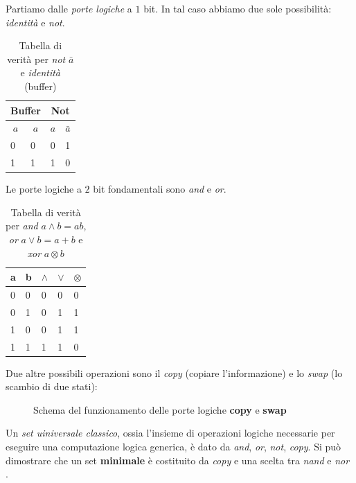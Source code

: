 \documentclass[../../InformazioneQuantistica.tex]{subfiles}
\begin{document}
Partiamo dalle \textit{porte logiche} a $1$ bit. In tal caso abbiamo due sole possibilità: \textit{identità} e \textit{not}.

\begin{table}[H]
\centering
\begin{tabular}{@{}ll|ll@{}}
\toprule
\multicolumn{2}{c|}{\textbf{Buffer}} & \multicolumn{2}{c|}{\textbf{Not}} \\ \midrule
\multicolumn{1}{c}{$a$} & \multicolumn{1}{c|}{$a$} & \multicolumn{1}{c}{$a$} & \multicolumn{1}{c}{$\bar{a}$} \\
0 & 0 & 0 & 1 \\
1 & 1 & 1 & 0 \\ \bottomrule
\end{tabular}
\caption{Tabella di verità per \textit{not} $\bar{a}$ e \textit{identità} (buffer)}
\label{tab:notbuffer}
\end{table}

Le porte logiche a $2$ bit fondamentali sono \textit{and} e \textit{or}.
\begin{table}[H]
\centering
\begin{tabular}{@{}ll|lll@{}}
\toprule
\multicolumn{1}{c}{a} & \multicolumn{1}{c}{b} & \multicolumn{1}{c}{$\land$} & \multicolumn{1}{c}{$\lor$} & \multicolumn{1}{c}{$\otimes$} \\ \midrule
0 & 0 & 0 & 0 & 0 \\
0 & 1 & 0 & 1 & 1 \\
1 & 0 & 0 & 1 & 1 \\
1 & 1 & 1 & 1 & 0 \\ \bottomrule
\end{tabular}
\caption{Tabella di verità per \textit{and} $a \land b = ab$, \textit{or} $a\lor b =a+b$ e \textit{xor} $a\otimes b$}
\label{tab:orandxor}
\end{table}

Due altre possibili operazioni sono il \emph{copy} (copiare l'informazione) e lo \emph{swap} (lo scambio di due stati):

\begin{figure}[H]
\centering

\caption{Schema del funzionamento delle porte logiche \textbf{copy} e \textbf{swap}\label{fig:copy-swap}}
\end{figure}

Un \textit{set uiniversale classico}, ossia l'insieme di operazioni logiche necessarie per eseguire una computazione logica generica, è dato da \textit{and}, \textit{or}, \textit{not}, \textit{copy}. Si può dimostrare che un set \textbf{minimale} è costituito da \textit{copy} e una scelta tra \textit{nand} e \textit{nor} \cite{nand2tetris}.\\
\end{document}
